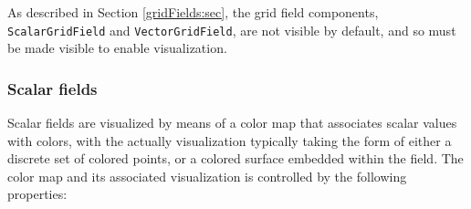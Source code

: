 \begin{sideblock}
As described in Section \ref{gridFields:sec}, the grid field
components, {\tt ScalarGridField} and {\tt VectorGridField}, are not
visible by default, and so must be made visible to enable
visualization.
\end{sideblock}

\subsubsection{Scalar fields}

Scalar fields are visualized by means of a color map that associates
scalar values with colors, with the actually visualization typically
taking the form of either a discrete set of colored points, or a
colored surface embedded within the field. The color map and its
associated visualization is controlled by the following properties:


